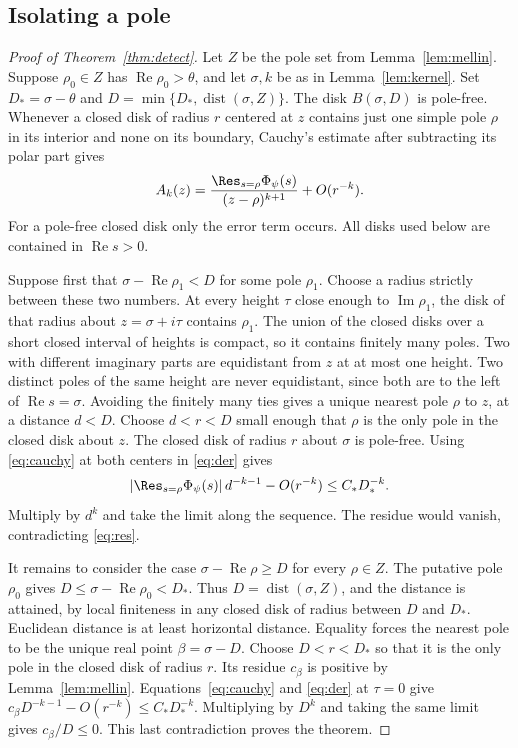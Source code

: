 \documentclass[a4paper,11pt]{article}
\theoremstyle{definition}
\theoremstyle{remark}
\newcommand{\real}{\operatorname{Re}}\newcommand{\imag}{\operatorname{Im}}
\numberwithin{equation}{section}
\begin{document}
\subsection{Isolating a pole}\label{nav:I-06}
\label{sec:near}
\begin{proof}[Proof of Theorem~\ref{thm:detect}]
Let \(Z\) be the pole set from Lemma~\ref{lem:mellin}. Suppose \(\rho_0\in Z\) has \(\real\rho_0>\theta\), and let \(\sigma,k\) be as in Lemma~\ref{lem:kernel}. Set \(D_*=\sigma-\theta\) and
\(D=\min\{D_*,\operatorname{dist}(\sigma,Z)\}\).
The disk \(B(\sigma,D)\) is pole-free. Whenever a closed disk of radius \(r\) centered at \(z\) contains just one simple pole \(\rho\) in its interior and none on its boundary, Cauchy's estimate after subtracting its polar part gives
\begin{equation}
 A_k(z)=\frac{\Res_{s=\rho}\Phi_\psi(s)}{(z-\rho)^{k+1}}+O(r^{-k}).
 \label{eq:cauchy}
\end{equation}
For a pole-free closed disk only the error term occurs. All disks used below are contained in \(\real s>0\).

Suppose first that \(\sigma-\real\rho_1<D\) for some pole \(\rho_1\). Choose a radius strictly between these two numbers. At every height \(\tau\) close enough to \(\imag\rho_1\), the disk of that radius about \(z=\sigma+i\tau\) contains \(\rho_1\). The union of the closed disks over a short closed interval of heights is compact, so it contains finitely many poles. Two with different imaginary parts are equidistant from \(z\) at at most one height. Two distinct poles of the same height are never equidistant, since both are to the left of \(\real s=\sigma\). Avoiding the finitely many ties gives a unique nearest pole \(\rho\) to \(z\), at a distance \(d<D\). Choose \(d<r<D\) small enough that \(\rho\) is the only pole in the closed disk about \(z\). The closed disk of radius \(r\) about \(\sigma\) is pole-free. Using \eqref{eq:cauchy} at both centers in \eqref{eq:der} gives
\[
 |\Res_{s=\rho}\Phi_\psi(s)|\,d^{-k-1}-O(r^{-k})
                       \le C_*D_*^{-k}.
\]
Multiply by \(d^k\) and take the limit along the sequence. The residue would vanish, contradicting \eqref{eq:res}.

It remains to consider the case \(\sigma-\real\rho\ge D\) for every \(\rho\in Z\). The putative pole \(\rho_0\) gives \(D\le\sigma-\real\rho_0<D_*\). Thus \(D=\operatorname{dist}(\sigma,Z)\), and the distance is attained, by local finiteness in any closed disk of radius between \(D\) and \(D_*\). Euclidean distance is at least horizontal distance. Equality forces the nearest pole to be the unique real point \(\beta=\sigma-D\). Choose \(D<r<D_*\) so that it is the only pole in the closed disk of radius \(r\). Its residue \(c_\beta\) is positive by Lemma~\ref{lem:mellin}. Equations~\eqref{eq:cauchy} and \eqref{eq:der} at \(\tau=0\) give
\(c_\beta D^{-k-1}-O(r^{-k})\le C_*D_*^{-k}\).
Multiplying by \(D^k\) and taking the same limit gives \(c_\beta/D\le0\). This last contradiction proves the theorem.
\end{proof}
\end{document}
